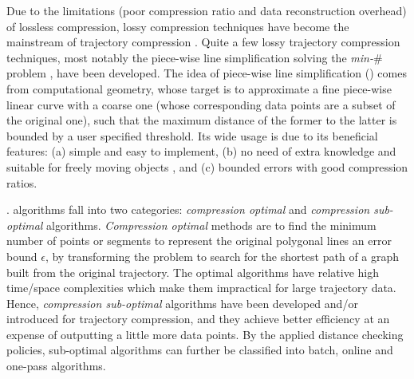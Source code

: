 Due to the  limitations (poor compression ratio and data reconstruction overhead) of lossless compression, lossy compression techniques have become the mainstream of trajectory compression \cite{Lin:Operb,Zhang:Evaluation}. Quite a few lossy trajectory compression techniques, most notably the piece-wise line simplification \cite{Douglas:Peucker, Hershberger:Speeding, Keogh:online,Liu:BQS, Muckell:Compression, Chen:Trajectory, Chen:Fast, Cao:Spatio, Shi:Survey} solving the \emph{min-$\#$} problem \cite{Chan:Optimal, Imai:Optimal,Pavlidis:Segment}, have been developed. The idea of piece-wise line simplification (\lsa) comes from computational geometry, whose target is to approximate a fine piece-wise linear curve with a coarse one (whose corresponding data points are a subset of the original one), such that the maximum distance of the former to the latter is bounded by a user specified threshold. Its wide usage is due to its beneficial features: (a) simple and easy to implement, (b) no need of extra knowledge and suitable for freely  moving  objects \cite{Popa:Spatio}, and (c) bounded errors with good compression ratios.

%


. \lsa algorithms fall into two categories: \textit{compression optimal} and \textit{compression sub-optimal} algorithms.
\textit{Compression optimal} methods \cite{Imai:Optimal,Chan:Optimal} are to find the minimum number of points or segments to represent the original polygonal lines \wrt an error bound $\epsilon$, by transforming the problem to search for the shortest path of a graph built from the original trajectory.
The optimal \lsa algorithms have relative high time/space complexities which make them impractical for large trajectory data.
Hence, \textit{compression sub-optimal} \lsa algorithms have been developed and/or introduced for trajectory compression, and they achieve better efficiency at an expense of outputting a little more data points. By the applied distance checking policies, sub-optimal algorithms can further be classified into batch, online and one-pass algorithms.

